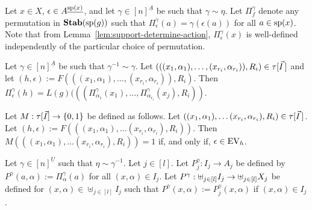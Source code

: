 \documentclass[../main/thesis.tex]{subfiles}
\begin{document}
Let $x \in X$, $\epsilon \in A^{\underline{\text{sp}(x)}}$, and let $\gamma \in
[n]^{\underline{A}}$ be such that $\gamma \sim \eta$. Let $\Pi^{\gamma}_{f}$
denote any permutation in $\text{\textbf{Stab}} (\text{sp} (g))$ such that $\Pi^{\gamma}_\epsilon (a) =
\gamma (\epsilon(a))$ for all $a \in \text{sp}(x)$. Note that from
Lemma~\ref{lem:support-determine-action}, $\Pi^{\gamma}_{\epsilon}(x)$ is
well-defined independently of the particular choice of permutation.

\begin{lem}
  Let $\gamma \in [n]^{\underline{A}}$ be such that $\gamma^{-1} \sim \gamma$.
  Let $(((x_1, \alpha_1), \ldots, (x_{r_i}, \alpha_{r_i})), R_i) \in
  \tau[\vec{I}\,]$ and let $(h, \epsilon) := F(((x_1, \alpha_1),
  \ldots, (x_{r_i}, \alpha_{r_i})), R_i)$. Then $\Pi^{\gamma}_{\epsilon} (h) =
  L(g)(((\Pi^{\gamma}_{\alpha_1} (x_1), \ldots,
  \Pi^{\gamma}_{\alpha_{r_i}}(x_j), R_i))$.
  \label{lem:defining-h-from-index}
\end{lem}

Let $M : \tau[\vec{I}] \rightarrow \{0,1\}$ be defined as follows. Let $((x_1,
\alpha_1), \ldots (x_{r_i}, \alpha_{r_i}), R_i) \in \tau[\vec{I} \,]$.
Let $(h, \epsilon) := F(((x_1, \alpha_1), \ldots (x_{r_i}, \alpha_{r_i}),
R_i))$. Then $M(((x_1, \alpha_1), \ldots (x_{r_i}, \alpha_{r_i}), R_i)) = 1$ if,
and only if, $\epsilon \in \text{EV}_h$.

Let $\gamma \in [n]^{\underline{U}}$ such that $\eta \sim \gamma^{-1}$. Let $j
\in [l]$. Let $P^{\gamma}_j: I_j \rightarrow A_j$ be defined by $P^{\gamma} (a,
\alpha) := \Pi^{\gamma}_{\alpha}(a)$ for all $(x, \alpha) \in I_j$. Let
$P^{\gamma} : \uplus_{j \in [l]} I_j \rightarrow \uplus_{j \in [l]}X_j$ be defined for
$(x, \alpha) \in \uplus_{j \in [l]} I_j$ such that $P^{\gamma}(x, \alpha) :=
P^{\gamma}_j (x, \alpha)$ if $(x, \alpha) \in I_j$.
\end{document}
